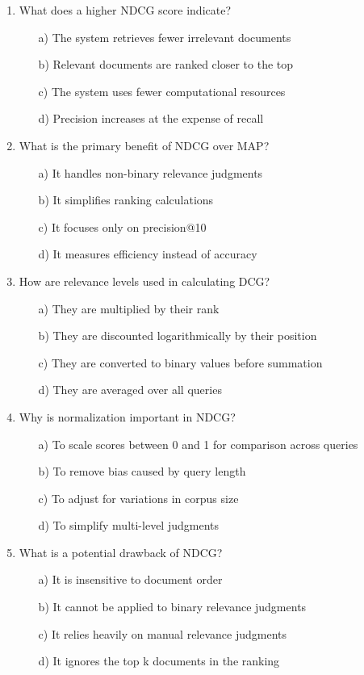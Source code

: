 \documentclass[8pt]{extarticle}
\begin{document}
\begin{multicols}{2}
\begin{enumerate}
\item What does a higher NDCG score indicate?
\begin{itemize}
\item[a)] The system retrieves fewer irrelevant documents
\item[b)] Relevant documents are ranked closer to the top
\item[c)] The system uses fewer computational resources
\item[d)] Precision increases at the expense of recall
\end{itemize}

\item What is the primary benefit of NDCG over MAP?
\begin{itemize}
\item[a)] It handles non-binary relevance judgments
\item[b)] It simplifies ranking calculations
\item[c)] It focuses only on precision@10
\item[d)] It measures efficiency instead of accuracy
\end{itemize}

\item How are relevance levels used in calculating DCG?
\begin{itemize}
\item[a)] They are multiplied by their rank
\item[b)] They are discounted logarithmically by their position
\item[c)] They are converted to binary values before summation
\item[d)] They are averaged over all queries
\end{itemize}

\item Why is normalization important in NDCG?
\begin{itemize}
\item[a)] To scale scores between 0 and 1 for comparison across queries
\item[b)] To remove bias caused by query length
\item[c)] To adjust for variations in corpus size
\item[d)] To simplify multi-level judgments
\end{itemize}

\item What is a potential drawback of NDCG?
\begin{itemize}
\item[a)] It is insensitive to document order
\item[b)] It cannot be applied to binary relevance judgments
\item[c)] It relies heavily on manual relevance judgments
\item[d)] It ignores the top k documents in the ranking
\end{itemize}


\end{enumerate}
\end{multicols}
\end{document}
